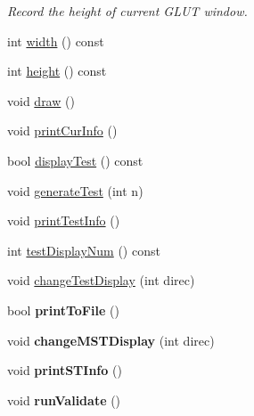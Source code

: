 \begin{DoxyCompactItemize}
\begin{DoxyCompactList}\small\item\em Record the height of current G\+L\+UT window. \end{DoxyCompactList}\item 
int \hyperlink{classcmst_1_1_window_a5fc4ccbd9afed56cd17d341269028da2}{width} () const 
\item 
int \hyperlink{classcmst_1_1_window_a6fc02b2afee52c0f71b6a3bd39c9210f}{height} () const 
\item 
void \hyperlink{classcmst_1_1_window_a1d78ef796691e87ed3b4978f373c9890}{draw} ()
\item 
void \hyperlink{classcmst_1_1_window_a73eb23d7d7418cb288022e623e590461}{print\+Cur\+Info} ()
\item 
bool \hyperlink{classcmst_1_1_window_aa3f5edeebdd298190bdb4676b4838f75}{display\+Test} () const 
\item 
void \hyperlink{classcmst_1_1_window_acda99115d9c67f83de4d8f5a94f2647c}{generate\+Test} (int n)
\item 
void \hyperlink{classcmst_1_1_window_a471e1648f99754f7c2cbfbbb1e8ab556}{print\+Test\+Info} ()
\item 
int \hyperlink{classcmst_1_1_window_ae456c1bf45fc28133390fcc881fbd612}{test\+Display\+Num} () const 
\item 
void \hyperlink{classcmst_1_1_window_aa8dc3725888e12fc2c6e3626ab7b600a}{change\+Test\+Display} (int direc)
\item 
bool {\bfseries print\+To\+File} ()\hypertarget{classcmst_1_1_window_a1d2514395cd8e864ddcd6aadf127bbbc}{}\label{classcmst_1_1_window_a1d2514395cd8e864ddcd6aadf127bbbc}

\item 
void {\bfseries change\+M\+S\+T\+Display} (int direc)\hypertarget{classcmst_1_1_window_ae9d9bf19cad20b34a6ab850a8a218c13}{}\label{classcmst_1_1_window_ae9d9bf19cad20b34a6ab850a8a218c13}

\item 
void {\bfseries print\+S\+T\+Info} ()\hypertarget{classcmst_1_1_window_a5b39068b3053a7fe98f3d94de802fecb}{}\label{classcmst_1_1_window_a5b39068b3053a7fe98f3d94de802fecb}

\item 
void {\bfseries run\+Validate} ()\hypertarget{classcmst_1_1_window_ab2073132753d04d6cf7b882549f1ceea}{}\label{classcmst_1_1_window_ab2073132753d04d6cf7b882549f1ceea}

\end{DoxyCompactItemize}

